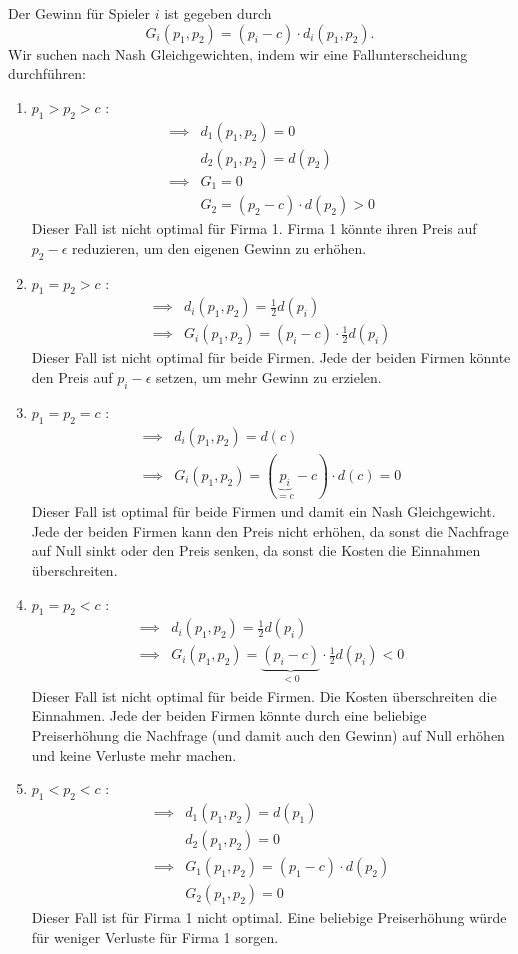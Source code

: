 Der Gewinn für Spieler $i$ ist gegeben durch
\[
	G_{i}(p_1,p_2) = (p_{i} - c) \cdot d_{i}(p_1,p_2)
.\] 
Wir suchen nach Nash Gleichgewichten, indem wir eine Fallunterscheidung durchführen:
\begin{enumerate}[label=Fall \arabic{enumi}:]
	\item $p_1 > p_2 > c$ :
		\begin{align*}
			\implies & d_1(p_1,p_2) = 0 \\
					 & d_2(p_1,p_2) = d(p_2) \\
			\implies & G_1 = 0 \\
					 & G_2 = (p_2 - c) \cdot d(p_2) > 0
		\end{align*}
		Dieser Fall ist nicht optimal für Firma 1. Firma 1 könnte ihren Preis auf $p_2-\epsilon $ reduzieren, um den eigenen Gewinn zu erhöhen.
	\item $p_1 = p_2 > c$ :
		\begin{align*}
			\implies & d_{i}(p_1,p_2) = \frac{1}{2}d(p_{i}) \\
			\implies & G_{i}(p_1,p_2) = (p_{i}-c) \cdot \frac{1}{2}d(p_{i})
		\end{align*}
		Dieser Fall ist nicht optimal für beide Firmen. Jede der beiden Firmen könnte den Preis auf $p_{i}-\epsilon $ setzen, um mehr Gewinn zu erzielen.

	\item $p_1=p_2=c$ :
		\begin{align*}
			\implies & d_{i}(p_1,p_2) = d(c) \\
			\implies & G_{i}(p_1,p_2) = (\underbrace{p_{i}}_{=c} -c) \cdot d(c) = 0
		\end{align*}
		Dieser Fall ist optimal für beide Firmen und damit ein Nash Gleichgewicht.
		Jede der beiden Firmen kann den Preis nicht erhöhen, da sonst die Nachfrage auf Null sinkt oder den Preis senken, da sonst die Kosten die Einnahmen überschreiten.
	\item $p_1 = p_2 < c$ :
		\begin{align*}
			\implies & d_{i}(p_1,p_2) = \frac{1}{2}d(p_{i}) \\
			\implies & G_{i}(p_1,p_2) = \underbrace{(p_{i}-c)}_{<0} \cdot \frac{1}{2}d(p_{i}) < 0
		\end{align*}
		Dieser Fall ist nicht optimal für beide Firmen. Die Kosten überschreiten die Einnahmen. Jede der beiden Firmen könnte durch eine beliebige Preiserhöhung die Nachfrage (und damit auch den Gewinn) auf Null erhöhen und keine Verluste mehr machen.

	\item $p_1 < p_2 < c$ :
		\begin{align*}
			\implies & d_1(p_1,p_2) = d(p_1) \\
					 & d_2(p_1,p_2) = 0 \\
			\implies & G_1(p_1,p_2) = (p_1-c)\cdot d(p_2) \\
					 & G_2(p_1,p_2) = 0
		\end{align*}
		Dieser Fall ist für Firma 1 nicht optimal. Eine beliebige Preiserhöhung würde für weniger Verluste für Firma 1 sorgen.
\end{enumerate}

